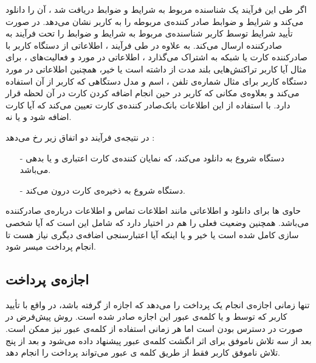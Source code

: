 \documentclass[oneside]{report}
\begin{document}
اگر طی این فرآیند یک شناسنده مربوط به شرایط و 	ضوابط دریافت شد ، 
{\normalsize {}}
آن را دانلود می‌کند و شرایط و ضوابط صادر کننده‌ی مربوطه را به کاربر نشان می‌دهد. در صورت تأیید شرایط توسط کاربر 
{\normalsize {}}
شناسنده‌ی مربوط به شرایط و ضوابط را تحت فرآیند 
{\normalsize {}}  
به صادرکننده ارسال می‌کند. به علاوه در طی فرآیند 
{\normalsize {}}   ، 
{\normalsize {}} 
اطلاعاتی از دستگاه کاربر با صادرکننده کارت یا شبکه به اشتراک می‌گذارد ، اطلاعاتی در مورد 
{\normalsize {}}
و فعالیت‌های 
{\normalsize {}}
، برای مثال آیا کاربر تراکنش‌هایی بلند مدت از 
{\normalsize {}}
داشته است یا خیر، همچنین اطلاعاتی در مورد دستگاه کاربر برای مثال شماره‌ی تلفن ، اسم و مدل دستگاهی که کاربر از آن استفاده می‌کند و بعلاوه‌ی مکانی که کاربر در حین انجام اضافه کردن کارت در آن لحظه قرار دارد. 
با استفاده از این اطلاعات بانک‌صادر کننده‌ی کارت تعیین می‌کند که آیا کارت اضافه شود و یا نه. 

در  نتیجه‌ی فرآیند 
{\normalsize {}} 
دو اتفاق زیر رخ می‌دهد : 
\begin{itemize}
	\item[-] دستگاه شروع به دانلود  {\normalsize {}}   می‌کند، که نمایان کننده‌ی کارت اعتباری و یا بدهی می‌باشد.
	\item[-] دستگاه شروع به ذخیره‌ی کارت درون {\normalsize {}} می‌کند. 
\end{itemize}


{\normalsize {}} 
حاوی 
{\normalsize {}} ها
	برای دانلود 
	{\normalsize {}}
	و اطلاعاتی مانند اطلاعات تماس و اطلاعات درباره‌ی صادرکننده می‌باشد. همچنین وضعیت فعلی را هم در اختیار دارد که شامل این است که آیا شخصی سازی 
	{\normalsize {}}
	کامل شده است یا خیر و یا اینکه آیا اعتبارسنجی اضافه‌ی دیگری نیاز هست تا انجام پرداخت میسر شود.
	
\subsection{اجازه‌ی پرداخت}

{\normalsize {}}
تنها زمانی اجازه‌ی انجام یک پرداخت را می‌دهد که اجازه از 
{\normalsize {}}
گرفته باشد، در واقع با تأیید کاربر که توسط 
{\normalsize {}} 
و یا کلمه‌ی عبور این اجازه صادر شده است. 
{\normalsize {}} 
روش پیش‌فرض در صورت در دسترس بودن است اما هر زمانی استفاده از کلمه‌ی عبور نیز ممکن است. بعد از سه تلاش ناموفق برای اثر انگشت کلمه‌ی عبور پیشنهاد داده می‌شود و بعد از پنج تلاش ناموفق کاربر فقط از طریق کلمه ی عبور می‌تواند پرداخت را انجام دهد. 
\end{document}

